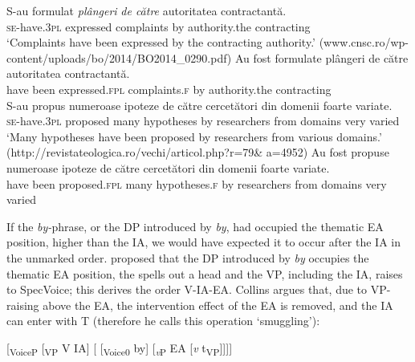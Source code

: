 \documentclass[output=paper]{langsci/langscibook}
\begin{document}
\ea%
    \label{ex:giurgea:29}
    \begin{xlista}[m'.]
    \ex
    \gll  S-au             {formulat} \emph{plângeri}     \emph{de către} autoritatea     contractantă.\\
          \textsc{se-}have.\textsc{3pl} expressed complaints by          authority.the contracting\\
    \glt  ‘Complaints have been expressed by the contracting authority.’ (www.cnsc.ro/wp-content/uploads/bo/2014/BO2014\_0290.pdf)
    \gll Au   fost  formulate        plângeri          {de către} autoritatea    contractantă.\\
         have been expressed.\textsc{fpl} complaints.\textsc{f} by          authority.the contracting\\
    \ex
    \gll S-au           propus    numeroase ipoteze {de către} cercetători din domenii foarte variate.\\
         \textsc{se-}have.\textsc{3pl} proposed many        hypotheses by    researchers from domains very varied\\
    \glt ‘Many hypotheses have been proposed by researchers from various domains.’ (http://revistateologica.ro/vechi/articol.php?r=79\& a=4952)
    \gll Au  fost    propuse   numeroase ipoteze      {de către} cercetători din domenii foarte variate.\\
         have been proposed.\textsc{fpl} many hypotheses.\textsc{f} by    researchers from domains very varied\\
    \end{xlista}
\z    

If the \textit{by-}phrase, or the DP introduced by \textit{by}, had occupied the thematic EA position, higher than the IA, we would have expected it to occur after the IA in the unmarked order. \citet{Collins2005} proposed that the DP introduced by \textit{by} occupies the thematic EA position, the  spells out a head  and the VP, including the IA, raises to SpecVoice; this derives the order V-IA-EA. Collins argues that, due to VP-raising above the EA, the intervention effect of the EA is removed, and the IA can enter  with T (therefore he calls this operation ‘smuggling'):

\ea%
    \label{ex:giurgea:30}
    [\textsubscript{VoiceP}  [\textsubscript{VP} V IA] [ [\textsubscript{Voice0}  by] [\textit{\textsubscript{v}}\textsubscript{P} EA [\textit{v} t\textsubscript{VP}]]]]
    \z
\end{document}
